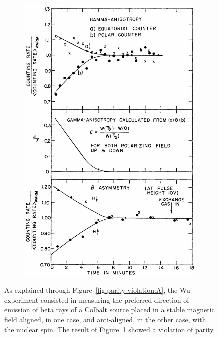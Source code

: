\begin{figure}[H]
\begin{subfigure}{0.5\linewidth}
			\includegraphics[width=0.5\plotwidth]{fig/chapt2/Wu_result.png}
			\caption{\label{fig:parity-violation:B}}
		\end{subfigure}
		\caption{\label{fig:parity-violation} As explained through Figure~\ref{fig:parity-violation:A}, the Wu experiment consisted in measuring the preferred direction of emission of beta rays of a Colbalt source placed in a stable magnetic field aligned, in one case, and anti-aligned, in the other case, with the nuclear spin. The result of Figure~\ref{fig:parity-violation:B} showed a violation of parity.}
	\end{figure}
	
